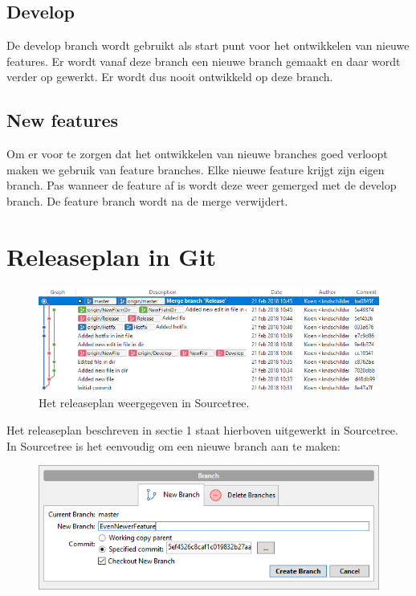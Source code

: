 \documentclass[12pt]{article}
\begin{document}
\subsection{Develop}
De develop branch wordt gebruikt als start punt voor het ontwikkelen van nieuwe features. Er wordt vanaf deze branch een nieuwe branch gemaakt en daar wordt verder op gewerkt. Er wordt dus nooit ontwikkeld op deze branch.
\subsection{New features}
Om er voor te zorgen dat het ontwikkelen van nieuwe branches goed verloopt maken we gebruik van feature branches. Elke nieuwe feature krijgt zijn eigen branch. Pas wanneer de feature af is wordt deze weer gemerged met de develop branch. De feature branch wordt na de merge verwijdert.



\pagebreak
\section{Releaseplan in Git}
\begin{figure}[H]
	\includegraphics[width=\textwidth]{images/ReleasePlanInGit.png}
	\caption{Het releaseplan weergegeven in Sourcetree.}
\end{figure}
Het releaseplan beschreven in sectie 1 staat hierboven uitgewerkt in Sourcetree. In Sourcetree is het eenvoudig om een nieuwe branch aan te maken:

\begin{figure}[H]
	\centering
	\includegraphics[width=\textwidth]{images/NewBranch.png}
\end{figure}
\end{document}
